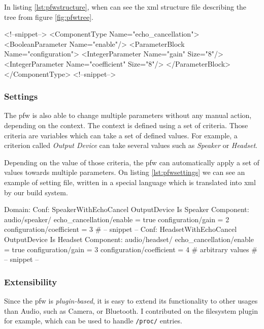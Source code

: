 In listing \ref{lst:pfwstructure}, when can see the \gls{xml} structure file
describing the tree from figure \ref{fig:pfwtree}.

\begin{code}[language=pfwXml, caption=Structure file example snippet, label=lst:pfwstructure]
<!--snippet-->
<ComponentType Name="echo_cancellation">
    <BooleanParameter Name="enable"/>
    <ParameterBlock Name="configuration">
        <IntegerParameter Name="gain" Size="8"/>
        <IntegerParameter Name="coefficient" Size="8"/>
    </ParameterBlock>
</ComponentType>
<!--snippet-->
\end{code}

\subsubsection{Settings}
The \gls{pfw} is also able to change multiple parameters without any manual action, depending on the context.
The context is defined using a set of criteria. Those criteria are variables which can take a set of defined values.
For example, a criterion called \emph{Output Device} can take several values such as \emph{Speaker} or \emph{Headset}.

Depending on the value of those criteria, the \gls{pfw} can automatically apply a set of values towards
multiple parameters.
On listing \ref{lst:pfwsettings} we can see an example of setting file, written in a special language
which is translated into \gls{xml} by our build system.

\begin{code}[language=pfwLang, caption=Settings file example, label=lst:pfwsettings]
Domain:
    Conf: SpeakerWithEchoCancel
        OutputDevice Is Speaker
        Component: audio/speaker/
            echo_cancellation/enable = true
            configuration/gain = 2
            configuration/coefficient = 3
        # -- snippet --
    Conf: HeadsetWithEchoCancel
        OutputDevice Is Headset
        Component: audio/headset/
            echo_cancellation/enable = true
            configuration/gain = 3
            configuration/coefficient = 4 # arbitrary values
        # -- snippet --
\end{code}

\subsubsection{Extensibility}
Since the \gls{pfw} is \emph{plugin-based}, it is easy to extend its functionality to other usages than Audio, such
as Camera, or Bluetooth. I contributed on the filesystem plugin for example, which can be used to handle \lstinline{/proc/} entries.


